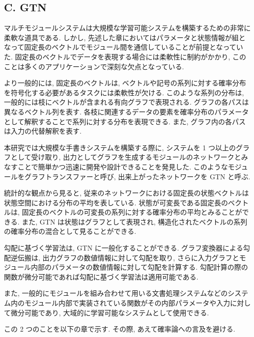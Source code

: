 \documentclass[twocolumn]{jarticle}     %
\begin{document}
\subsection*{C. GTN}
マルチモジュールシステムは大規模な学習可能システムを構築するための非常に柔軟な道具である. しかし, 先述した章においてはパラメータと状態情報が組となって固定長のベクトルでモジュール間を通信していることが前提となっていた.
固定長のベクトルでデータを表現する場合には柔軟性に制約がかかり, このことは多くのアプリケーションで深刻な欠点となっている.
\par
より一般的には, 固定長のベクトルは, ベクトルや記号の系列に対する確率分布を符号化する必要があるタスクには柔軟性が欠ける. このような系列の分布は, 一般的には枝にベクトルが含まれる有向グラフで表現される. 
グラフの各パスは異なるベクトル列を表す. 各枝に関連するデータの要素を確率分布のパラメータとして解釈することで系列に対する分布を表現できる. また, グラフ内の各パスは入力の代替解釈を表す.
\par
本研究では大規模な手書きシステムを構築する際に, システムを 1 つ以上のグラフとして受け取り, 出力としてグラフを生成するモジュールのネットワークとみなすことで簡単かつ迅速に開発や設計できることを発見した.
このようなモジュールをグラフトランスファーと呼び, 出来上がったネットワークを GTN と呼ぶ.
\par
統計的な観点から見ると, 従来のネットワークにおける固定長の状態ベクトルは状態空間における分布の平均を表している.
状態が可変長である固定長のベクトルは, 固定長のベクトルの可変長の系列に対する確率分布の平均とみることができる.
また, GTN は状態はグラフとして表現され, 構造化されたベクトルの系列の確率分布の混合として見ることができる.
\par
勾配に基づく学習法は, GTN に一般化することができる.
グラフ変換器による勾配逆伝搬は, 出力グラフの数値情報に対して勾配を取り, さらに入力グラフとモジュール内部のパラメータの数値情報に対して勾配を計算する. 勾配計算の際の関数が微分可能であれば勾配に基づく学習法は適用可能である.
\par
また, 一般的にモジュールを組み合わせて用いる文書処理システムなどのシステム内のモジュール内部で実装されている関数がその内部パラメータや入力に対して微分可能であり, 大域的に学習可能なシステムとして使用できる.
\par
この 2 つのことを以下の章で示す. その際, あえて確率論への言及を避ける. 
\end{document}
